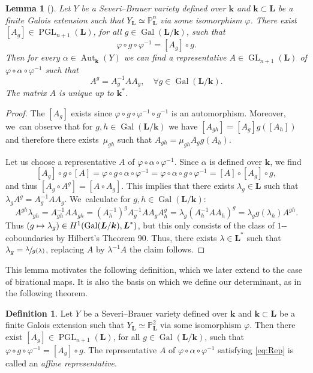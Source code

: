 \documentclass[10pt,a4paper]{amsart}
\providecommand{\nobreakdash}{\nobreak\hbox{-}}
\newcommand\mto{\mathchoice{\longmapsto}{\mapsto}{\mapsto}{\mapsto}}
\DeclareMathOperator{\Gal}{Gal}
\newtheorem{lemma}[theorem]{Lemma}
\theoremstyle{definition}
\newtheorem{definition}[theorem]{Definition}
\newcommand{\kk}{{\boldsymbol{k}}}
\newcommand{\LL}{{\boldsymbol{L}}}
\DeclareMathOperator{\PGL}{PGL}
\DeclareMathOperator{\GL}{GL}
\DeclareMathOperator{\Aut}{Aut}
\begin{document}
\begin{lemma}[\cite{BSYUnp}] \label{AutRep}
Let $Y$ be a Severi--Brauer variety defined over $\kk$ and $\kk \subset \LL$ be a finite Galois extension such that $Y_{\LL} \simeq \mathbb{P}^n_{\LL}$ via some isomorphism $\varphi$. There exist $[A_g] \in \PGL_{n + 1}(\LL)$, for all $ g \in \Gal(\LL/\kk)$, such that
\[
\varphi \circ g \circ \varphi^{-1} = [A_g] \circ g.
\]
Then for every $\alpha \in \Aut_{\kk}(Y)$ we can find a representative $A \in \GL_{n + 1}(\LL)$ of $\varphi \circ \alpha \circ \varphi^{-1}$ such that
\begin{equation} \label{eq:Rep}
A^g = A_g^{-1}AA_g,\quad \forall g \in \Gal(\LL/\kk).
\end{equation}
The matrix $A$ is unique up to $\kk^*$.
\end{lemma}

\begin{proof}
The $[A_g]$ exists since $\varphi \circ g \circ \varphi^{-1} \circ g^{-1}$ is an automorphism. Moreover, we~can observe that for $g,h \in \Gal(\LL/\kk)$ we have $[A_{gh}] = [A_g]g([A_h])$ and therefore there exists~$\mu_{gh}$ such that $A_{gh} = \mu_{gh}A_g g(A_h)$.

Let us choose a representative $A$ of $\varphi \circ \alpha \circ \varphi^{-1}$. Since $\alpha$ is defined over $\kk$, we find
\[
[A_g] \circ g \circ [A] = \varphi \circ g \circ \alpha \circ \varphi^{-1} = \varphi \circ \alpha \circ g \circ \varphi^{-1} = [A] \circ [A_g] \circ g,
\]
and thus $[A_g \circ A^g] = [A \circ A_g]$. This implies that there exists $\lambda_g \in \LL$ such that $\lambda_g A^g = A_g^{-1} A A_g$. We~calculate for $g,h \in \Gal(\LL/ \kk)$:
\[
A^{gh} \lambda_{gh} = A_{gh}^{-1} A A_{gh} = (A_h^{-1})^g A_g^{-1} A A_g A_h^g = \lambda_g (A_h^{-1} A A_h)^g = \lambda_g g(\lambda_h) A^{gh}.
\]
Thus $(g \mto \lambda_g) \in H^1(\Gal(\LL/\kk),\LL^*)$, but this only consists of the class of $1$\nobreakdash-cobound\-aries by Hilbert's Theorem 90. Thus, there exists $\lambda \in \LL^*$ such that $\lambda_g = \sfrac{\lambda}{g(\lambda)}$, replacing $A$ by $\lambda^{-1} A$ the claim follows.
\end{proof}
This lemma motivates the following definition, which we later extend to the case of birational maps. It is also the basis on which we define our determinant, as in the following theorem.

\begin{definition}
Let $Y$ be a Severi--Brauer variety defined over $\kk$ and $\kk \subset \LL$ be a finite Galois extension such that $Y_{\LL} \simeq \mathbb{P}^2_{\LL}$ via some isomorphism $\varphi$. Then there exist $[A_g] \in \PGL_{n + 1}(\LL)$, for all $ g \in \Gal(\LL/\kk)$, such that $\varphi \circ g \circ \varphi^{-1} = [A_g] \circ g$. The representative $A$ of $\varphi \circ \alpha \circ \varphi^{-1}$ satisfying \eqref{eq:Rep} is called an \emph{affine representative}.
\end{definition}
\end{document}
